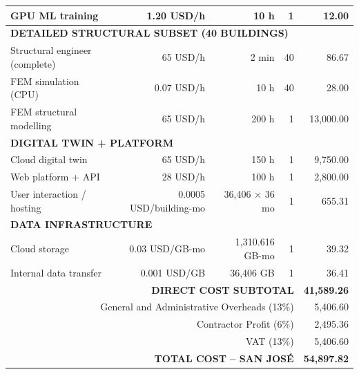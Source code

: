 \begin{longtable}{lrrrr}
GPU ML training & 1.20 USD/h & 10 h & 1 & 12.00 \\
\hline

\multicolumn{5}{l}{\textbf{DETAILED STRUCTURAL SUBSET (40 BUILDINGS)}} \\

Structural engineer (complete) & 65 USD/h & 2 min & 40 & 86.67 \\
FEM simulation (CPU) & 0.07 USD/h & 10 h & 40 & 28.00 \\
FEM structural modelling & 65 USD/h & 200 h & 1 & 13,000.00 \\
\hline

\multicolumn{5}{l}{\textbf{DIGITAL TWIN + PLATFORM}} \\

Cloud digital twin & 65 USD/h & 150 h & 1 & 9,750.00 \\
Web platform + API & 28 USD/h & 100 h & 1 & 2,800.00 \\
User interaction / hosting & 0.0005 USD/building-mo & 36,406 × 36 mo & 1 & 655.31 \\
\hline

\multicolumn{5}{l}{\textbf{DATA INFRASTRUCTURE}} \\

Cloud storage & 0.03 USD/GB-mo & 1,310.616 GB-mo & 1 & 39.32 \\
Internal data transfer & 0.001 USD/GB & 36,406 GB & 1 & 36.41 \\
\hline

\multicolumn{4}{r}{\textbf{DIRECT COST SUBTOTAL}} & \textbf{41,589.26} \\
\hline
\multicolumn{4}{r}{General and Administrative Overheads (13\%)} & 5,406.60 \\
\multicolumn{4}{r}{Contractor Profit (6\%)} & 2,495.36 \\
\multicolumn{4}{r}{VAT (13\%)} & 5,406.60 \\
\hline
\multicolumn{4}{r}{\textbf{TOTAL COST – SAN JOSÉ}} & \textbf{54,897.82} \\
\hline

\end{longtable}
















